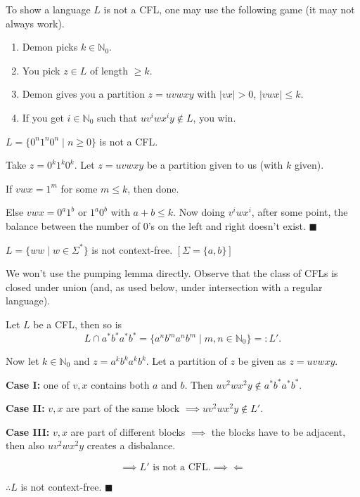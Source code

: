 To show a language $L$ is not a CFL, one may use the following game (it may not always work).

\begin{enumerate}[1.]
    \item Demon picks $k \in \mathbb{N}_0$.
    \item You pick $z \in L$ of length $\geq k$.
    \item Demon gives you a partition $z = uvwxy$ with $|vx| > 0$, $|vwx| \leq k$.
    \item If you get $i \in \mathbb{N}_0$ such that $uv^iwx^iy \notin L$, you win.
\end{enumerate}

\begin{example}
$L = \{0^n1^n0^n \mid n \geq 0\}$ is not a CFL.

Take $z = 0^k1^k0^k$. Let $z = uvwxy$ be a partition given to us (with $k$ given).

If $vwx = 1^m$ for some $m \leq k$, then done.

Else $vwx = 0^a1^b$ or $1^a0^b$ with $a+b \leq k$. Now doing $v^iwx^i$, after some point, the balance between the number of $0$'s on the left and right doesn't exist. \hfill$\blacksquare$
\end{example}

\begin{example}
$L = \{ww \mid w \in \Sigma^*\}$ is not context-free. \quad $[\Sigma = \{a,b\}]$

We won't use the pumping lemma directly. Observe that the class of CFLs is closed under union (and, as used below, under intersection with a regular language).

Let $L$ be a CFL, then so is
\[
L \cap a^*b^*a^*b^* = \{a^nb^ma^nb^m \mid m,n \in \mathbb{N}_0\} =: L'.
\]

Now let $k \in \mathbb{N}_0$ and $z = a^kb^ka^kb^k$. Let a partition of $z$ be given as $z = uvwxy$.

\medskip
\noindent\textbf{Case I:} one of $v, x$ contains both $a$ and $b$. Then $uv^2wx^2y \notin a^*b^*a^*b^*$.

\medskip
\noindent\textbf{Case II:} $v, x$ are part of the same block $\implies uv^2wx^2y \notin L'$.

\medskip
\noindent\textbf{Case III:} $v, x$ are part of different blocks $\implies$ the blocks have to be adjacent, then also $uv^2wx^2y$ creates a disbalance.

\[
\implies L' \text{ is not a CFL.} \implies\Leftarrow
\]

$\therefore L$ is not context-free. \hfill$\blacksquare$
\end{example}

